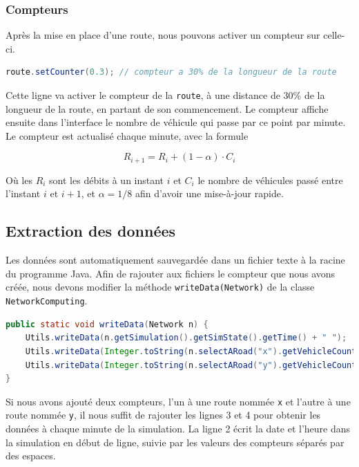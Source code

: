 \documentclass[a4paper,11pt, titlepage]{extarticle}
\begin{document}
\subsubsection{Compteurs}

Après la mise en place d'une route, nous pouvons activer un compteur sur celle-ci.

\begin{lstlisting}[language=Java]
route.setCounter(0.3); // compteur a 30% de la longueur de la route
\end{lstlisting}

Cette ligne va activer le compteur de la \texttt{route}, à une distance de 30\% de la longueur de la route, en partant de son commencement. Le compteur affiche ensuite dans l'interface le nombre de véhicule qui passe par ce point par minute. Le compteur est actualisé chaque minute, avec la formule

\begin{equation*}
R_{i+1} = R_i + (1-\alpha) \cdot C_i
\end{equation*}

Où les $R_i$ sont les débits à un instant $i$ et $C_i$ le nombre de véhicules passé entre l'instant $i$ et $i+1$, et $\alpha = 1/8$ afin d'avoir une mise-à-jour rapide.

\subsection{Extraction des données}

Les données sont automatiquement sauvegardée dans un fichier texte à la racine du programme Java. Afin de rajouter aux fichiers le compteur que nous avons créée, nous devons modifier la méthode \texttt{writeData(Network)} de la classe \texttt{NetworkComputing}.

\begin{lstlisting}[language=Java]
public static void writeData(Network n) {
	Utils.writeData(n.getSimulation().getSimState().getTime() + " ");
	Utils.writeData(Integer.toString(n.selectARoad("x").getVehicleCounter().getCounter())+" ");
	Utils.writeData(Integer.toString(n.selectARoad("y").getVehicleCounter().getCounter())+"\n");
}
\end{lstlisting}

Si nous avons ajouté deux compteurs, l'un à une route nommée \texttt{x} et l'autre à une route nommée \texttt{y}, il nous suffit de rajouter les lignes 3 et 4 pour obtenir les données à chaque minute de la simulation. La ligne 2 écrit la date et l'heure dans la simulation en début de ligne, suivie par les valeurs des compteurs séparés par des espaces.
\end{document}
